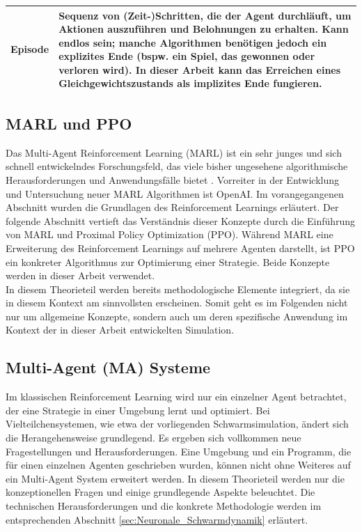 \documentclass{solutionclass}
\begin{document}
\begin{table}[h!]
\begin{tabular}{|p{2.4cm}|p{11cm}|}
        \hline
        \textbf{Episode} & Sequenz von (Zeit-)Schritten, die der Agent durchläuft, um Aktionen auszuführen und Belohnungen zu erhalten. Kann endlos sein; manche Algorithmen benötigen jedoch ein explizites Ende (bspw. ein Spiel, das gewonnen oder verloren wird). In dieser Arbeit kann das Erreichen eines Gleichgewichtszustands als implizites Ende fungieren. \\
        \hline
    \end{tabular}
\end{table}

\subsection{MARL und PPO}

Das Multi-Agent Reinforcement Learning (MARL) ist ein sehr junges und sich schnell entwickelndes Forschungsfeld, das viele bisher ungesehene algorithmische Herausforderungen und Anwendungsfälle bietet \cite{MARLReview2021, CityFlow2019}. Vorreiter in der Entwicklung und Untersuchung neuer MARL Algorithmen ist OpenAI. Im vorangegangenen Abschnitt wurden die Grundlagen des Reinforcement Learnings erläutert. Der folgende Abschnitt vertieft das Verständnis dieser Konzepte durch die Einführung von MARL und Proximal Policy Optimization (PPO). Während MARL eine Erweiterung des Reinforcement Learnings auf mehrere Agenten darstellt, ist PPO ein konkreter Algorithmus zur Optimierung einer Strategie. Beide Konzepte werden in dieser Arbeit verwendet.\\

In diesem Theorieteil werden bereits methodologische Elemente integriert, da sie in diesem Kontext am sinnvollsten erscheinen. Somit geht es im Folgenden nicht nur um allgemeine Konzepte, sondern auch um deren spezifische Anwendung im Kontext der in dieser Arbeit entwickelten Simulation.

\subsection*{Multi-Agent (MA) Systeme}
Im klassischen Reinforcement Learning wird nur ein einzelner Agent betrachtet, der eine Strategie in einer Umgebung lernt und optimiert. Bei Vielteilchensystemen, wie etwa der vorliegenden Schwarmsimulation, ändert sich die Herangehensweise grundlegend. Es ergeben sich vollkommen neue Fragestellungen und Herausforderungen. Eine Umgebung und ein Programm, die für einen einzelnen Agenten geschrieben wurden, können nicht ohne Weiteres auf ein Multi-Agent System erweitert werden. In diesem Theorieteil werden nur die konzeptionellen Fragen und einige grundlegende Aspekte beleuchtet. Die technischen Herausforderungen und die konkrete Methodologie werden im entsprechenden Abschnitt \ref{sec:Neuronale_Schwarmdynamik} erläutert.\\
\end{document}

